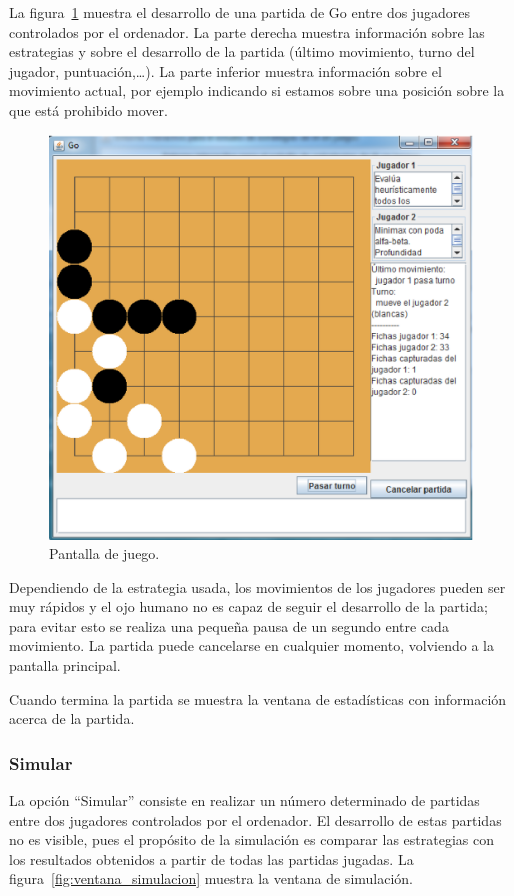 La figura~\ref{fig:ventana_jugar} muestra el desarrollo de una partida de Go entre dos jugadores controlados por el ordenador.
La parte derecha muestra información sobre las estrategias y sobre el desarrollo de la partida (último movimiento, turno del jugador, puntuación,\ldots). La parte inferior muestra información sobre el movimiento actual, por ejemplo indicando si estamos sobre una posición sobre la que está prohibido mover.

\begin{figure}[!h]
	\centering
	\includegraphics[scale=0.5]{contenido/apendiceA/imagenes/ventanaJuego.eps}
	\caption{Pantalla de juego.}
	\label{fig:ventana_jugar}
\end{figure}

Dependiendo de la estrategia usada, los movimientos de los jugadores pueden ser muy rápidos y el ojo humano no es capaz de seguir el desarrollo de la partida; para evitar esto se realiza una pequeña pausa de un segundo entre cada movimiento.
La partida puede cancelarse en cualquier momento, volviendo a la pantalla principal.

Cuando termina la partida se muestra la ventana de estadísticas con información acerca de la partida.

\subsubsection{Simular}
\label{sssec:simular}
La opción ``Simular'' consiste en realizar un número determinado de partidas entre dos jugadores controlados por el ordenador.
El desarrollo de estas partidas no es visible, pues el propósito de la simulación es comparar las estrategias con los resultados obtenidos a partir de todas las partidas jugadas.
La figura~\ref{fig:ventana_simulacion} muestra la ventana de simulación.

